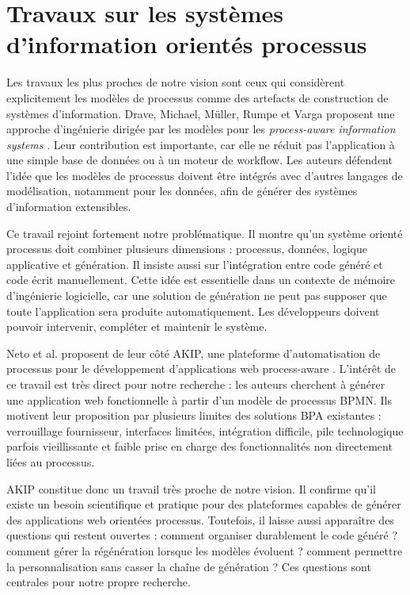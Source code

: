 \documentclass[12pt,a4paper]{article}
\begin{document}
\section{Travaux sur les systèmes d'information orientés processus}

Les travaux les plus proches de notre vision sont ceux qui considèrent explicitement les modèles de processus comme des artefacts de construction de systèmes d'information. Drave, Michael, Müller, Rumpe et Varga proposent une approche d'ingénierie dirigée par les modèles pour les \textit{process-aware information systems} \cite{drave2022}. Leur contribution est importante, car elle ne réduit pas l'application à une simple base de données ou à un moteur de workflow. Les auteurs défendent l'idée que les modèles de processus doivent être intégrés avec d'autres langages de modélisation, notamment pour les données, afin de générer des systèmes d'information extensibles.

Ce travail rejoint fortement notre problématique. Il montre qu'un système orienté processus doit combiner plusieurs dimensions : processus, données, logique applicative et génération. Il insiste aussi sur l'intégration entre code généré et code écrit manuellement. Cette idée est essentielle dans un contexte de mémoire d'ingénierie logicielle, car une solution de génération ne peut pas supposer que toute l'application sera produite automatiquement. Les développeurs doivent pouvoir intervenir, compléter et maintenir le système.

Neto et al. proposent de leur côté AKIP, une plateforme d'automatisation de processus pour le développement d'applications web process-aware \cite{neto2022}. L'intérêt de ce travail est très direct pour notre recherche : les auteurs cherchent à générer une application web fonctionnelle à partir d'un modèle de processus BPMN. Ils motivent leur proposition par plusieurs limites des solutions BPA existantes : verrouillage fournisseur, interfaces limitées, intégration difficile, pile technologique parfois vieillissante et faible prise en charge des fonctionnalités non directement liées au processus.

AKIP constitue donc un travail très proche de notre vision. Il confirme qu'il existe un besoin scientifique et pratique pour des plateformes capables de générer des applications web orientées processus. Toutefois, il laisse aussi apparaître des questions qui restent ouvertes : comment organiser durablement le code généré ? comment gérer la régénération lorsque les modèles évoluent ? comment permettre la personnalisation sans casser la chaîne de génération ? Ces questions sont centrales pour notre propre recherche.
\end{document}
